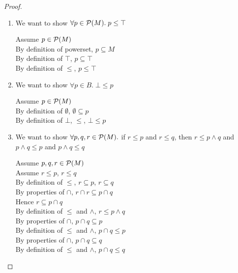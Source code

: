 \begin{proof}
\begin{enumerate}
\item  We want to show $\forall p \in \mathcal{P}(M).\; p \leq \top$
  \begin{tabbedproof}
        Assume $p \in \mathcal{P}(M)$ \\
    \oo By definition of powerset, $p \subseteq M$ \\
    \oo By definition of $\top$, $p \subseteq \top$ \\
    \oo By definition of $\leq$, $p \leq \top$ \\
  \end{tabbedproof}

\item We want to show $\forall p \in B.\; \bot \leq p$
  \begin{tabbedproof}
        Assume $p \in \mathcal{P}(M)$ \\ 
    \oo By definition of $\emptyset$, $\emptyset \subseteq p$ \\
    \oo By definition of $\bot$, $\leq$, $\bot \leq p$ \\
  \end{tabbedproof}

\item We want to show $\forall p,q,r \in \mathcal{P}(M).$ if $r \leq p$ and $r \leq q$, then
      $r \leq p \land q$ and 
      $p \land q \leq p$ and $p \land q \leq q$

   \begin{tabbedproof}
      Assume $p,q,r \in \mathcal{P}(M)$ \\
      Assume $r \leq p$, $r \leq q$ \\[1em]

      \oo By definition of $\leq$, $r \subseteq p$, $r \subseteq q$ \\
      \oo By properties of $\cap$, $r \cap r \subseteq p \cap q$ \\
      \oo Hence $r \subseteq p \cap q$ \\
      \oo By definition of $\leq$ and $\land$, $r \leq p \land q$ \\[1em]
      \oo By properties of $\cap$, $p \cap q \subseteq p$ \\
      \oo By definition of $\leq$ and $\land$, $p \cap q \leq p$ \\[1em]
      \oo By properties of $\cap$, $p \cap q \subseteq q$ \\
      \oo By definition of $\leq$ and $\land$, $p \cap q \leq q$ \\
   \end{tabbedproof}


\end{enumerate}
\end{proof}
